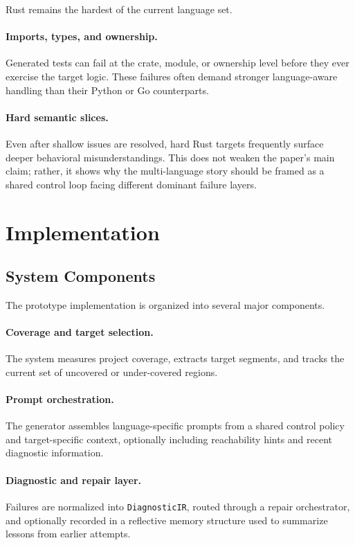 \documentclass[10pt]{article}
\begin{document}
Rust remains the hardest of the current language set.

\paragraph{Imports, types, and ownership.}
Generated tests can fail at the crate, module, or ownership level before they ever exercise the target logic. These failures often demand stronger language-aware handling than their Python or Go counterparts.

\paragraph{Hard semantic slices.}
Even after shallow issues are resolved, hard Rust targets frequently surface deeper behavioral misunderstandings. This does not weaken the paper's main claim; rather, it shows why the multi-language story should be framed as a shared control loop facing different dominant failure layers.

\section{Implementation}
\label{sec:implementation}

\subsection{System Components}

The prototype implementation is organized into several major components.

\paragraph{Coverage and target selection.}
The system measures project coverage, extracts target segments, and tracks the current set of uncovered or under-covered regions.

\paragraph{Prompt orchestration.}
The generator assembles language-specific prompts from a shared control policy and target-specific context, optionally including reachability hints and recent diagnostic information.

\paragraph{Diagnostic and repair layer.}
Failures are normalized into \texttt{DiagnosticIR}, routed through a repair orchestrator, and optionally recorded in a reflective memory structure used to summarize lessons from earlier attempts.
\end{document}
